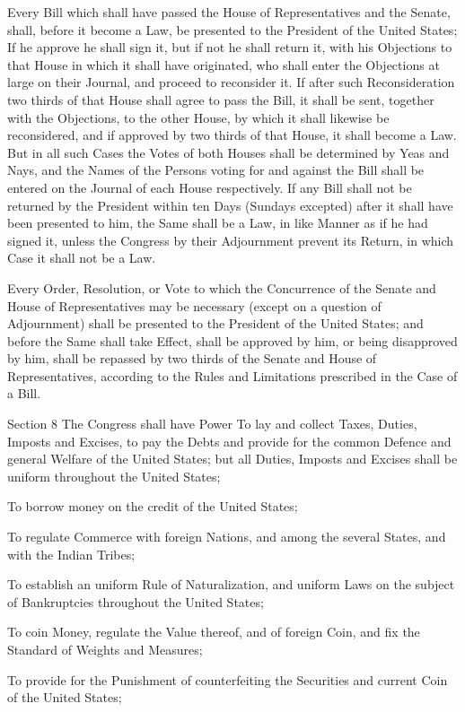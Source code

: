 \documentclass{article}
\begin{document}
Every Bill which shall have passed the House of Representatives and the Senate,
shall, before it become a Law, be presented to the President of the United
States; If he approve he shall sign it, but if not he shall return it, with his
Objections to that House in which it shall have originated, who shall enter the
Objections at large on their Journal, and proceed to reconsider it. If after
such Reconsideration two thirds of that House shall agree to pass the Bill, it
shall be sent, together with the Objections, to the other House, by which it
shall likewise be reconsidered, and if approved by two thirds of that House, it
shall become a Law. But in all such Cases the Votes of both Houses shall be
determined by Yeas and Nays, and the Names of the Persons voting for and
against the Bill shall be entered on the Journal of each House respectively. If
any Bill shall not be returned by the President within ten Days (Sundays
excepted) after it shall have been presented to him, the Same shall be a Law,
in like Manner as if he had signed it, unless the Congress by their Adjournment
prevent its Return, in which Case it shall not be a Law.

Every Order, Resolution, or Vote to which the Concurrence of the Senate and
House of Representatives may be necessary (except on a question of Adjournment)
shall be presented to the President of the United States; and before the Same
shall take Effect, shall be approved by him, or being disapproved by him, shall
be repassed by two thirds of the Senate and House of Representatives, according
to the Rules and Limitations prescribed in the Case of a Bill.


Section 8
The Congress shall have Power To lay and collect Taxes, Duties, Imposts and
Excises, to pay the Debts and provide for the common Defence and general
Welfare of the United States; but all Duties, Imposts and Excises shall be
uniform throughout the United States;

To borrow money on the credit of the United States;

To regulate Commerce with foreign Nations, and among the several States, and
with the Indian Tribes;

To establish an uniform Rule of Naturalization, and uniform Laws on the subject
of Bankruptcies throughout the United States;

To coin Money, regulate the Value thereof, and of foreign Coin, and fix the
Standard of Weights and Measures;

To provide for the Punishment of counterfeiting the Securities and current Coin
of the United States;
\end{document}
